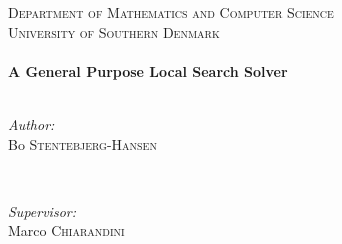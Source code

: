 \begin{center}
 

 
\textsc{\large Department of Mathematics and Computer Science}\\[0.5cm]
\textsc{\large University of Southern Denmark}\\[1.5cm]


\HRule \\[0.4cm]
{ \Huge \bfseries A General Purpose Local Search Solver }\\[0.4cm]
\HRule \\[.5cm]
 

 
\vspace{1cm}
\begin{minipage}{0.48\textwidth}
\begin{flushleft} \Large
\emph{Author:}\\
Bo \textsc{Stentebjerg-Hansen}\\ %
\end{flushleft}
\end{minipage}
~
\begin{minipage}{0.48\textwidth}
\begin{flushright} \Large
\emph{Supervisor:} \\
Marco \textsc{Chiarandini}
\end{flushright}
\end{minipage}\\[1.5cm]



\end{center}
